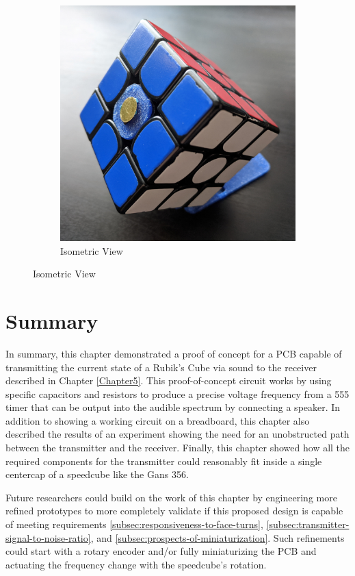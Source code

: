 \begin{figure}[h]
\begin{subfigure}{.30\textwidth}
    \end{subfigure}
    \begin{subfigure}{.30\textwidth}
        \centering
        \caption{Isometric View}
        \label{fig:core-placement-isometric}
        \includegraphics[width=\linewidth]{Figures/6 PCB Design/core_placement_isometric_square.jpg}
    \end{subfigure}
\end{figure}


\section{Summary}

In summary, this chapter demonstrated a proof of concept for a PCB
capable of transmitting the current state of a Rubik's Cube via sound
to the receiver described in Chapter \ref{Chapter5}. This
proof-of-concept circuit works by using specific capacitors and
resistors to produce a precise voltage frequency from a 555 timer that
can be output into the audible spectrum by connecting a speaker. In
addition to showing a working circuit on a breadboard, this chapter
also described the results of an experiment showing the need for an
unobstructed path between the transmitter and the receiver. Finally,
this chapter showed how all the required components for the transmitter
could reasonably fit inside a single centercap of a speedcube like the
Gans 356.

Future researchers could build on the work of this chapter by
engineering more refined prototypes to more completely validate if this
proposed design is capable of meeting requirements
\ref{subsec:responsiveness-to-face-turns},
\ref{subsec:transmitter-signal-to-noise-ratio}, and
\ref{subsec:prospects-of-miniaturization}. Such refinements could start
with a rotary encoder and/or fully miniaturizing the PCB and actuating
the frequency change with the speedcube's rotation.
